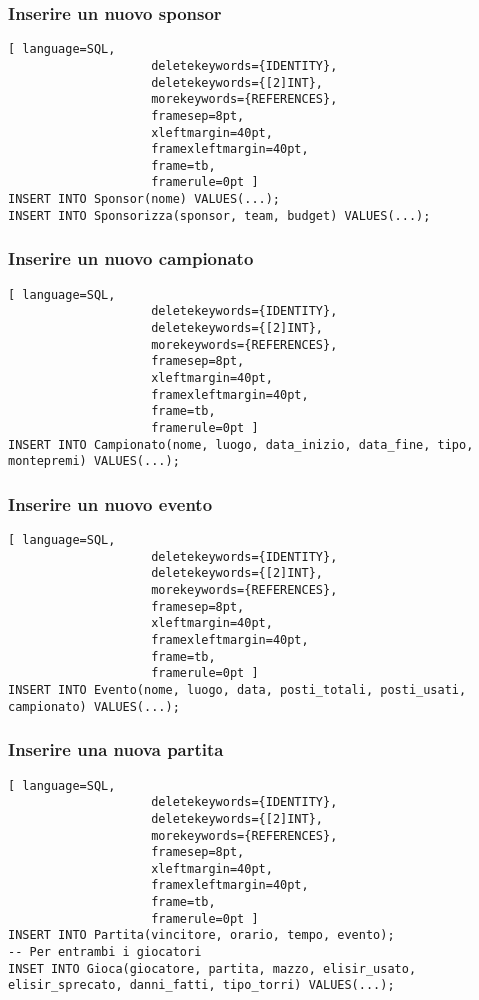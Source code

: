 \documentclass{article}
\begin{document}
\subsubsection{Inserire un nuovo sponsor}
\begin{lstlisting}[ language=SQL,
                    deletekeywords={IDENTITY},
                    deletekeywords={[2]INT},
                    morekeywords={REFERENCES},
                    framesep=8pt,
                    xleftmargin=40pt,
                    framexleftmargin=40pt,
                    frame=tb,
                    framerule=0pt ]
INSERT INTO Sponsor(nome) VALUES(...);
INSERT INTO Sponsorizza(sponsor, team, budget) VALUES(...);
\end{lstlisting}

\subsubsection{Inserire un nuovo campionato}
\begin{lstlisting}[ language=SQL,
                    deletekeywords={IDENTITY},
                    deletekeywords={[2]INT},
                    morekeywords={REFERENCES},
                    framesep=8pt,
                    xleftmargin=40pt,
                    framexleftmargin=40pt,
                    frame=tb,
                    framerule=0pt ]
INSERT INTO Campionato(nome, luogo, data_inizio, data_fine, tipo, montepremi) VALUES(...);
\end{lstlisting}

\subsubsection{Inserire un nuovo evento}
\begin{lstlisting}[ language=SQL,
                    deletekeywords={IDENTITY},
                    deletekeywords={[2]INT},
                    morekeywords={REFERENCES},
                    framesep=8pt,
                    xleftmargin=40pt,
                    framexleftmargin=40pt,
                    frame=tb,
                    framerule=0pt ]
INSERT INTO Evento(nome, luogo, data, posti_totali, posti_usati, campionato) VALUES(...);
\end{lstlisting}

\subsubsection{Inserire una nuova partita}
\begin{lstlisting}[ language=SQL,
                    deletekeywords={IDENTITY},
                    deletekeywords={[2]INT},
                    morekeywords={REFERENCES},
                    framesep=8pt,
                    xleftmargin=40pt,
                    framexleftmargin=40pt,
                    frame=tb,
                    framerule=0pt ]
INSERT INTO Partita(vincitore, orario, tempo, evento);
-- Per entrambi i giocatori
INSET INTO Gioca(giocatore, partita, mazzo, elisir_usato, elisir_sprecato, danni_fatti, tipo_torri) VALUES(...);
\end{lstlisting}
\end{document}

